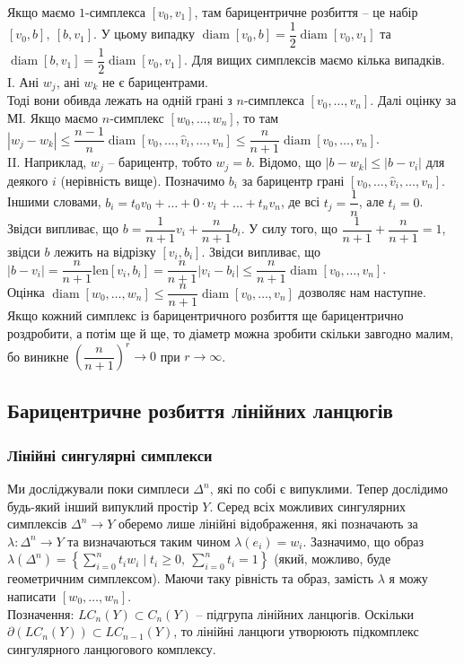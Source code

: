 \documentclass[a4paper, 10pt]{article}
\theoremstyle{theoremdd}
\theoremstyle{theoremdd}
\theoremstyle{theoremdd}
\theoremstyle{theoremdd}
\theoremstyle{theoremdd}
\theoremstyle{theoremdd}
\theoremstyle{theoremdd}
\theoremstyle{theoremdd}
\theoremstyle{theoremdd}
\theoremstyle{theoremdd}
\theoremstyle{theoremdd}
\theoremstyle{theoremdd}
\theoremstyle{theoremdd}
\theoremstyle{theoremdd}
\theoremstyle{theoremdd}
\DeclareMathOperator{\diam}{diam}
\begin{document}
Якщо маємо $1$-симплекса $[v_0,v_1]$, там барицентричне розбиття -- це набір $[v_0,b],\ [b,v_1]$. У цьому випадку $\diam[v_0,b] = \dfrac{1}{2} \diam[v_0,v_1]$ та $\diam[b,v_1] = \dfrac{1}{2} \diam[v_0,v_1]$. Для вищих симплексів маємо кілька випадків.\\
I. Ані $w_j$, ані $w_k$ не є барицентрами.\\
Тоді вони обивда лежать на одній грані з $n$-симплекса $[v_0,\dots,v_n]$. Далі оцінку за МІ. Якщо маємо $n$-симплекс $[w_0,\dots,w_n]$, то там $|w_j - w_k| \leq \dfrac{n-1}{n} \diam [v_0,\dots,\hat{v}_i,\dots,v_n] \leq \dfrac{n}{n+1} \diam [v_0,\dots,v_n]$.\\
II. Наприклад, $w_j$ -- барицентр, тобто $w_j = b$. Відомо, що $|b-w_k| \leq |b-v_i|$ для деякого $i$ (нерівність вище). Позначимо $b_i$ за барицентр грані $[v_0,\dots,\hat{v}_i,\dots,v_n]$. Іншими словами, $b_i = t_0 v_0 + \dots + 0 \cdot v_i + \dots + t_n v_n$, де всі $t_j = \dfrac{1}{n}$, але $t_i = 0$. Звідси випливає, що $b = \dfrac{1}{n+1}v_i + \dfrac{n}{n+1}b_i$. У силу того, що $\dfrac{1}{n+1} + \dfrac{n}{n+1} = 1$, звідси $b$ лежить на відрізку $[v_i,b_i]$. Звідси випливає, що $|b-v_i| = \dfrac{n}{n+1} \text{len}[v_i,b_i] = \dfrac{n}{n+1} |v_i-b_i| \leq \dfrac{n}{n+1} \diam [v_0,\dots,v_n]$.
\bigskip \\
Оцінка $\diam[w_0,\dots,w_n] \leq \dfrac{n}{n+1} \diam[v_0,\dots,v_n]$ дозволяє нам наступне. Якщо кожний симплекс із барицентричного розбиття ще барицентрично роздробити, а потім ще й ще, то діаметр можна зробити скільки завгодно малим, бо виникне $\left( \dfrac{n}{n+1}\right)^r \to 0$ при $r \to \infty$.

\subsection{Барицентричне розбиття лінійних ланцюгів}
\subsubsection{Лінійні сингулярні симплекси}
Ми досліджували поки симплеси $\Delta^n$, які по собі є випуклими. Тепер дослідимо будь-який інший випуклий простір $Y$. Серед всіх можливих сингулярних симплексів $\Delta^n \to Y$ оберемо лише лінійні відображення, які позначають за $\lambda \colon \Delta^n \to Y$ та визначаються таким чином $\lambda(e_i) = w_i$. Зазначимо, що образ $\lambda(\Delta^n) = \left\{ \displaystyle\sum_{i=0}^n t_i w_i \mid t_i \geq 0,\ \sum_{i=0}^n t_i = 1  \right\}$ (який, можливо, буде геометричним симплексом). Маючи таку рівність та образ, замість $\lambda$ я можу написати $[w_0,\dots,w_n]$.\\
Позначення: $LC_n(Y) \subset C_n(Y)$ -- підгрупа лінійних ланцюгів. Оскільки $\partial(LC_n(Y)) \subset LC_{n-1}(Y)$, то лінійні ланцюги утворюють підкомплекс сингулярного ланцюгового комплексу.
\end{document}
